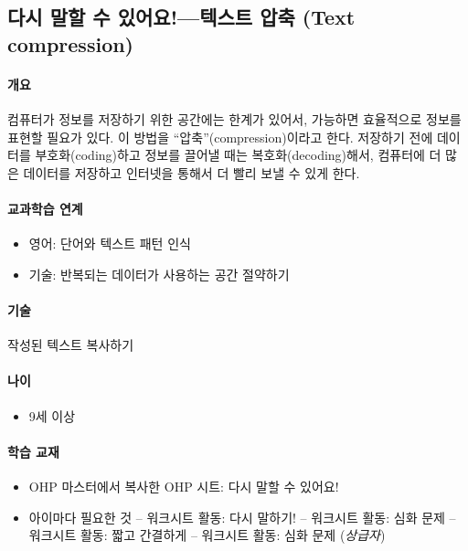 \documentclass[]{article}
\begin{document}
\subsection{다시 말할 수 있어요!---텍스트 압축 (Text
compression)}\label{mdash--text-compression}

\mbox{}\paragraph{개요}\label{section-43}

컴퓨터가 정보를 저장하기 위한 공간에는 한계가 있어서, 가능하면
효율적으로 정보를 표현할 필요가 있다. 이 방법을
``압축''(compression)이라고 한다. 저장하기 전에 데이터를
부호화(coding)하고 정보를 끌어낼 때는 복호화(decoding)해서, 컴퓨터에 더
많은 데이터를 저장하고 인터넷을 통해서 더 빨리 보낼 수 있게 한다.

\mbox{}\paragraph{교과학습 연계}\label{section-44}

\begin{itemize}
\itemsep1pt\parskip0pt
\item
  영어: 단어와 텍스트 패턴 인식
\item
  기술: 반복되는 데이터가 사용하는 공간 절약하기
\end{itemize}

\mbox{}\paragraph{기술}\label{section-45}

작성된 텍스트 복사하기

\mbox{}\paragraph{나이}\label{section-46}

\begin{itemize}
\itemsep1pt\parskip0pt
\item
  9세 이상
\end{itemize}

\mbox{}\paragraph{학습 교재}\label{section-47}

\begin{itemize}
\itemsep1pt\parskip0pt
\item
  OHP 마스터에서 복사한 OHP 시트: 다시 말할 수 있어요!
\item
  아이마다 필요한 것 -- 워크시트 활동: 다시 말하기! -- 워크시트 활동:
  심화 문제 -- 워크시트 활동: 짧고 간결하게 -- 워크시트 활동: 심화 문제
  (\emph{상급자})
\end{itemize}
\end{document}
